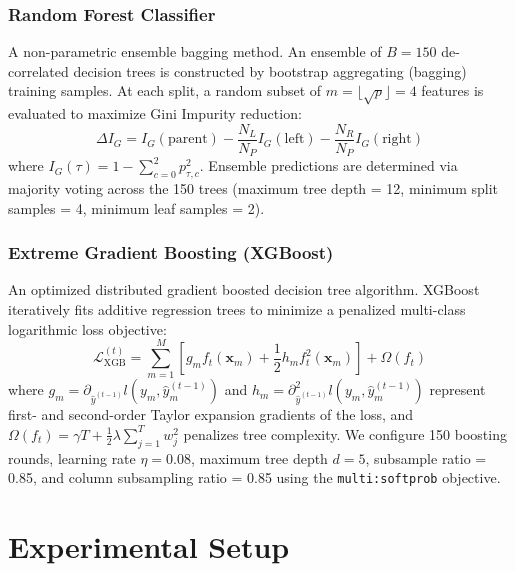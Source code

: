 \documentclass[conference]{IEEEtran}
\begin{document}
\subsubsection{Random Forest Classifier \cite{breiman2001random}}
A non-parametric ensemble bagging method. An ensemble of $B=150$ de-correlated decision trees is constructed by bootstrap aggregating (bagging) training samples. At each split, a random subset of $m = \lfloor\sqrt{p}\rfloor = 4$ features is evaluated to maximize Gini Impurity reduction:
\begin{equation}
    \Delta I_G = I_G(\text{parent}) - \frac{N_L}{N_P}I_G(\text{left}) - \frac{N_R}{N_P}I_G(\text{right})
\end{equation}
where $I_G(\tau) = 1 - \sum_{c=0}^2 p_{\tau, c}^2$. Ensemble predictions are determined via majority voting across the 150 trees (maximum tree depth = 12, minimum split samples = 4, minimum leaf samples = 2).

\subsubsection{Extreme Gradient Boosting (XGBoost) \cite{chen2016xgboost}}
An optimized distributed gradient boosted decision tree algorithm. XGBoost iteratively fits additive regression trees to minimize a penalized multi-class logarithmic loss objective:
\begin{equation}
    \mathcal{L}_{\text{XGB}}^{(t)} = \sum_{m=1}^M \left[ g_m f_t(\mathbf{x}_m) + \frac{1}{2} h_m f_t^2(\mathbf{x}_m) \right] + \Omega(f_t)
\end{equation}
where $g_m = \partial_{\hat{y}^{(t-1)}} l(y_m, \hat{y}_m^{(t-1)})$ and $h_m = \partial^2_{\hat{y}^{(t-1)}} l(y_m, \hat{y}_m^{(t-1)})$ represent first- and second-order Taylor expansion gradients of the loss, and $\Omega(f_t) = \gamma T + \frac{1}{2}\lambda \sum_{j=1}^T w_j^2$ penalizes tree complexity. We configure 150 boosting rounds, learning rate $\eta = 0.08$, maximum tree depth $d = 5$, subsample ratio = 0.85, and column subsampling ratio = 0.85 using the \texttt{multi:softprob} objective.

\section{Experimental Setup}
\end{document}
